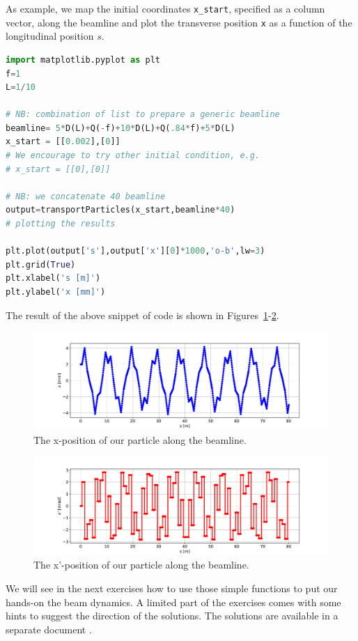 \documentclass{article}
\begin{document}
As example, we map the initial coordinates
 {\tt x\_start}, specified as a column vector, along the beamline and plot the 
transverse position {\tt x} as a  function of the longitudinal position $s$.
\begin{lstlisting}[language=Python]
import matplotlib.pyplot as plt
f=1
L=1/10

# NB: combination of list to prepare a generic beamline
beamline= 5*D(L)+Q(-f)+10*D(L)+Q(.84*f)+5*D(L)
x_start = [[0.002],[0]]
# We encourage to try other initial condition, e.g.
# x_start = [[0],[0]]

# NB: we concatenate 40 beamline
output=transportParticles(x_start,beamline*40)
# plotting the results

plt.plot(output['s'],output['x'][0]*1000,'o-b',lw=3)
plt.grid(True)
plt.xlabel('s [m]')
plt.ylabel('x [mm]')
\end{lstlisting}

The result of the above snippet of code is shown in Figures~\ref{fig:first_bl}-\ref{fig:second_bl}.
\begin{figure}
    \centering
    \includegraphics[width=1\textwidth]{_img_primer/first_bl.pdf}
    \caption{The x-position of our particle along the beamline.}
    \label{fig:first_bl}
\end{figure}
\begin{figure}
    \centering
    \includegraphics[width=1\textwidth]{_img_primer/second_bl.pdf}
    \caption{The x'-position of our particle along the beamline.}
    \label{fig:second_bl}
\end{figure}

We will see in the next exercises how to use those simple functions to put our hands-on the beam dynamics. A limited part of the exercises comes with some hints to suggest the direction of the solutions. The solutions are available in a separate document \cite{solutions}.
\end{document}
